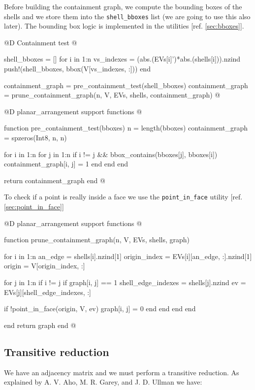 Before building the containment graph, we
compute the bounding boxes of the shells and we store them into
the \texttt{shell\_bboxes} list (we are going to use this also later).
The bounding box logic is implemented in the utilities
[ref. \ref{sec:bboxes}].

@D Containment test
@{shell_bboxes = []
for i in 1:n
    vs_indexes = (abs.(EVs[i]')*abs.(shells[i])).nzind
    push!(shell_bboxes, bbox(V[vs_indexes, :]))
end

containment_graph = pre_containment_test(shell_bboxes)
containment_graph = prune_containment_graph(n, V, EVs, shells, containment_graph)
@}

@D planar\_arrangement support functions
@{function pre_containment_test(bboxes)
    n = length(bboxes)
    containment_graph = spzeros(Int8, n, n)

    for i in 1:n
        for j in 1:n
            if i != j && bbox_contains(bboxes[j], bboxes[i])
                containment_graph[i, j] = 1
            end
        end
    end

    return containment_graph
end
@}

To check if a point is really inside a face we use the
\texttt{point\_in\_face} utility [ref. \ref{sec:point_in_face}]

@D planar\_arrangement support functions
@{function prune_containment_graph(n, V, EVs, shells, graph)
    
    for i in 1:n
        an_edge = shells[i].nzind[1]
        origin_index = EVs[i][an_edge, :].nzind[1]
        origin = V[origin_index, :]
 
        for j in 1:n
            if i != j
                if graph[i, j] == 1
                    shell_edge_indexes = shells[j].nzind
                    ev = EVs[j][shell_edge_indexes, :]

                    if !point_in_face(origin, V, ev)
                        graph[i, j] = 0
                    end
                end
             end
         end

     end
     return graph
end
@}

\subsection{Transitive reduction}

We have an adjacency matrix and we must perform a transitive reduction.
As explained by A. V. Aho, M. R. Garey, and J. D. Ullman \cite{transitive_reduction}
we have:

